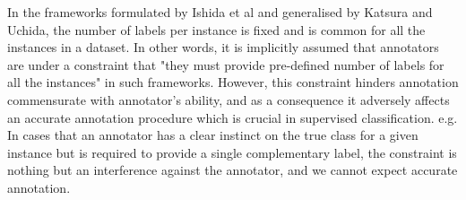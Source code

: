 \documentclass[a4paper,conference]{IEEEtran}
\begin{document}
In the frameworks formulated by Ishida et al and generalised by Katsura and Uchida, the number of labels per instance is fixed and is common for all the instances in a dataset.
In other words, it is implicitly assumed that annotators are under a constraint that "they must provide pre-defined number of labels for all the instances" in such frameworks.
However, this constraint hinders annotation commensurate with annotator's ability, and as a consequence it adversely affects an accurate annotation procedure which is crucial in supervised classification.  
e.g. In cases that an annotator has a clear instinct on the true class for a given instance but is required to provide a single complementary label, the constraint is nothing but an interference against the annotator, and we cannot expect accurate annotation.
\end{document}
